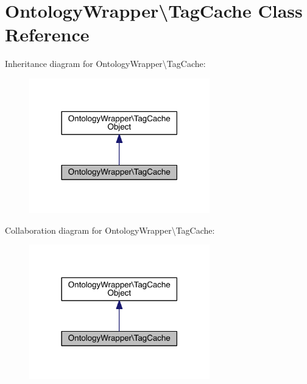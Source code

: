 \hypertarget{class_ontology_wrapper_1_1_tag_cache}{\section{Ontology\-Wrapper\textbackslash{}Tag\-Cache Class Reference}
\label{class_ontology_wrapper_1_1_tag_cache}
}


Inheritance diagram for Ontology\-Wrapper\textbackslash{}Tag\-Cache\-:\nopagebreak
\begin{figure}[H]
\begin{center}
\leavevmode
\includegraphics[width=222pt]{class_ontology_wrapper_1_1_tag_cache__inherit__graph}
\end{center}
\end{figure}


Collaboration diagram for Ontology\-Wrapper\textbackslash{}Tag\-Cache\-:\nopagebreak
\begin{figure}[H]
\begin{center}
\leavevmode
\includegraphics[width=222pt]{class_ontology_wrapper_1_1_tag_cache__coll__graph}
\end{center}
\end{figure}
